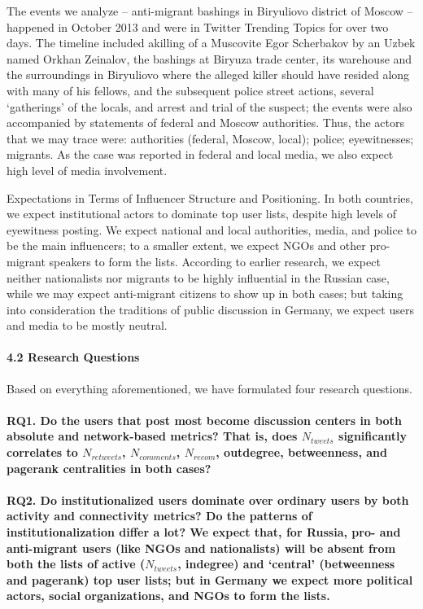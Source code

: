The events we analyze -- anti-migrant bashings in Biryuliovo district of Moscow -- happened in October 2013 and were in Twitter Trending Topics for over two days. The timeline included akilling of a Muscovite Egor Scherbakov by an Uzbek named Orkhan Zeinalov, the bashings at Biryuza trade center, its warehouse and the surroundings in Biryuliovo where the alleged killer should have resided along with many of his fellows, and the subsequent police street actions, several ‘gatherings’ of the locals, and arrest and trial of the suspect; the events were also accompanied by statements of federal and Moscow authorities. Thus, the actors that we may trace were: authorities (federal, Moscow, local); police; eyewitnesses; migrants. As the case was reported in federal and local media, we also expect high level of media involvement.

Expectations in Terms of Influencer Structure and Positioning. In both countries, we expect institutional actors to dominate top user lists, despite high levels of eyewitness posting. We expect national and local authorities, media, and police to be the main influencers; to a smaller extent, we expect NGOs and other pro-migrant speakers to form the lists. According to earlier research, we expect neither nationalists nor migrants to be highly influential in the Russian case, while we may expect anti-migrant citizens to show up in both cases; but taking into consideration the traditions of public discussion in Germany, we expect users and media to be mostly neutral.

\paragraph{4.2 Research Questions} 

Based on everything aforementioned, we have formulated four research questions.

\paragraph{RQ1. Do the users that post most become discussion centers in both absolute and network-based metrics? That is, does \(N_{tweets}\) significantly correlates to \(N_{retweets}\), \(N_{comments}\), \(N_{recom}\), outdegree, betweenness, and pagerank centralities in both cases?}

\paragraph{RQ2. Do institutionalized users dominate over ordinary users by both activity and connectivity metrics? Do the patterns of institutionalization differ a lot? We expect that, for Russia, pro- and anti-migrant users (like NGOs and nationalists) will be absent from both the lists of active (\(N_{tweets}\), indegree) and ‘central’ (betweenness and pagerank) top user lists; but in Germany we expect more political actors, social organizations, and NGOs to form the lists.}

